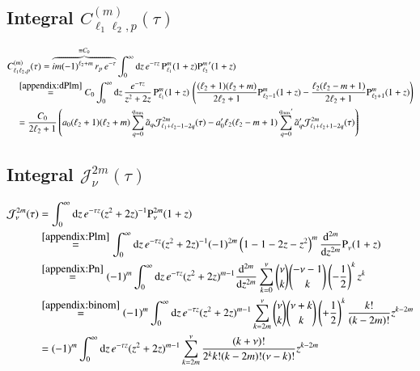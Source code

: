 \documentclass[10pt]{article}
\newcommand{\imag}{i} %
\newcommand{\e}{e}    %
\newcommand{\Plm}[2]{{\text{P}_{#1}^{#2}}}
\newcommand{\sep}{\quad}
\newcommand{\qmax}{{q_\text{max}}}
\begin{document}
\subsection{Integral $C_{\ell_1\ell_2,p}^{(m)}(\tau)$}

\begin{align}
\nonumber
&C_{\ell_1\ell_2,p}^{(m)}(\tau) = \overbrace{\imag m (-1)^{\ell_2+m} \, r_p \, \e^{-\tau}}^{\equiv C_0} \int_0^\infty \mathrm{d}z \, \e^{-\tau z} \, \Plm{\ell_1}{m}(1+z) \Plm{\ell_2}{m}^\prime(1+z) \\
\nonumber
&\sep\overset{\eqref{appendix:dPlm}}{=} C_0 \int_0^\infty \mathrm{d}z \, \frac{\e^{-\tau z}}{z^2+2z} \, \Plm{\ell_1}{m}(1+z) \, \left( \frac{(\ell_2+1)(\ell_2+m)}{2\ell_2+1} \Plm{\ell_2-1}{m}(1+z) - \frac{\ell_2(\ell_2-m+1)}{2\ell_2+1} \Plm{\ell_2+1}{m}(1+z) \right) \\
&\sep = \frac{C_0}{2\ell_2+1} \left(
    a_0 (\ell_2+1)(\ell_2+m) \sum_{q=0}^\qmax \tilde a_q \mathcal{J}_{\ell_1+\ell_2-1-2q}^{2m}(\tau)
    - a_0^\prime \ell_2(\ell_2-m+1) \sum_{q=0}^{\qmax^\prime} \tilde a_q^\prime \mathcal{J}_{\ell_1+\ell_2+1-2q}^{2m}(\tau) \right)
\end{align}


\subsection{Integral $\mathcal{J}_\nu^{2m}(\tau)$}

\begin{align}
\nonumber
\mathcal{J}_\nu^{2m}(\tau) &= \int_0^\infty \mathrm{d}z \, \e^{-\tau z} (z^2+2z)^{-1} \Plm{\nu}{2m}(1+z) \\
\nonumber
&\overset{\eqref{appendix:Plm}}{=} \int_0^\infty \mathrm{d}z \, \e^{-\tau z} (z^2+2z)^{-1} (-1)^{2m} \left(1-1-2z-z^2\right)^m \frac{\mathrm{d}^{2m}}{\mathrm{d}z^{2m}} \Plm{\nu}{}(1+z) \\
\nonumber
&\overset{\eqref{appendix:Pn}}{=} (-1)^m \int_0^\infty \mathrm{d}z \, \e^{-\tau z} (z^2+2z)^{m-1} \frac{\mathrm{d}^{2m}}{\mathrm{d}z^{2m}} \sum_{k=0}^\nu \binom{\nu}{k} \binom{-\nu-1}{k} \left(-\frac{1}{2}\right)^k z^k \\
\nonumber
&\overset{\eqref{appendix:binom}}{=} (-1)^m \int_0^\infty \mathrm{d}z \, \e^{-\tau z} (z^2+2z)^{m-1} \sum_{k=2m}^\nu \binom{\nu}{k} \binom{\nu+k}{k} \left(+\frac{1}{2}\right)^k \frac{k!}{(k-2m)!} z^{k-2m} \\
&= (-1)^m \int_0^\infty \mathrm{d}z \, \e^{-\tau z} (z^2+2z)^{m-1} \sum_{k=2m}^\nu \frac{(k+\nu)!}{2^k k! (k-2m)! (\nu-k)!} z^{k-2m}
\end{align}
\end{document}
